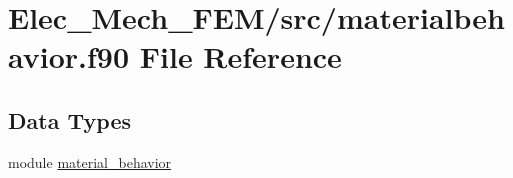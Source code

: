 \hypertarget{materialbehavior_8f90}{}\section{Elec\+\_\+\+Mech\+\_\+\+F\+E\+M/src/materialbehavior.f90 File Reference}
\label{materialbehavior_8f90}
\subsection*{Data Types}
\begin{DoxyCompactItemize}
\item 
module \hyperlink{classmaterial__behavior}{material\+\_\+behavior}
\end{DoxyCompactItemize}
